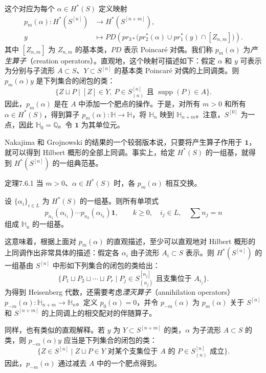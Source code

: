 这个对应为每个 $\alpha\in H^*(S)$ 定义映射
\[
\begin{aligned}
p_m(\alpha):H^*(S^{[n]})&\longrightarrow H^*(S^{[n+m]}),\\
y&\longmapsto PD\left(pr_{3*}\bigl(pr_2^*(\alpha)\cup pr_1^*(y)\cap[Z_{n,m}]\bigr)\right).
\end{aligned}
\]
其中 $[Z_{n,m}]$ 为 $Z_{n,m}$ 的基本类，$PD$ 表示 Poincaré 对偶。我们称 $p_m(\alpha)$ 为\emph{产生算子}（creation operators）。直观地，这个映射可描述如下：假定 $\alpha$ 和 $y$ 可表示为分别与子流形 $A\subset S$、$Y\subset S^{[n]}$ 的基本类 Poincaré 对偶的上同调类。则 $p_m(\alpha)y$ 是下列集合的闭包的类：
\[
\{Z\sqcup P\mid[Z]\in Y,\ P\in S_{(n)}^{[n]}
\text{ 且 }\operatorname{supp}(P)\in A\}.
\]
因此，$p_m(\alpha)$ 是在 $A$ 中添加一个肥点的操作。于是，对所有 $m>0$ 和所有 $\alpha\in H^*(S)$，得到算子 $p_m(\alpha):\mathbb H\to\mathbb H$，将 $\mathbb H_n$ 映到 $\mathbb H_{n+m}$。注意，$S^{[0]}$ 为一点，因此 $\mathbb H_0=\mathbb Q$。令 $\mathbf1$ 为其单位元。

Nakajima 和 Grojnowski 的结果的一个较弱版本说，只要将产生算子作用于 $\mathbf1$，就可以得到 Hilbert 概形的全部上同调。事实上，给定 $H^*(S)$ 的一组基，就得到 $H^*(S^{[n]})$ 的一组典范基。

\begin{origstatement}{定理}{7.6.1}\label{ch07:7.6.1}
当 $m>0$、$\alpha\in H^*(S)$ 时，各 $p_m(\alpha)$ 相互交换。

设 $\{\alpha_i\}_{i\in L}$ 为 $H^*(S)$ 的一组基。则所有单项式
\[
p_{n_1}(\alpha_{i_1})\cdots p_{n_k}(\alpha_{i_k})\mathbf1,
\qquad k\geq0,\quad i_j\in L,\quad\sum n_j=n
\]
组成 $\mathbb H_n$ 的一组基。
\end{origstatement}
这意味着，根据上面对 $p_m(\alpha)$ 的直观描述，至少可以直观地对 Hilbert 概形的上同调作出非常具体的描述：假定各 $\alpha_i$ 由子流形 $A_i\subset S$ 表示。则 $H^*(S^{[n]})$ 的一组基由 $S^{[n]}$ 中形如下列集合的闭包的类给出：
\[
\{P_1\sqcup P_2\sqcup\cdots\sqcup P_r\mid
P_j\in S_{(n_j)}^{[n_j]}\text{ 且支集位于 }A_{i_j}\}.
\]
为得到 Heisenberg 代数，还需要考虑\emph{湮灭算子}（annihilation operators）$p_{-m}(\alpha):\mathbb H_{n+m}\to\mathbb H_n$。定义 $p_0(\alpha)=0$，并令 $p_{-m}(\alpha)$ 为 $p_m(\alpha)$ 关于 $S^{[n]}$ 和 $S^{[n+m]}$ 的上同调上的相交配对的伴随算子。

同样，也有类似的直观解释。若 $y$ 为 $Y\subset S^{[n+m]}$ 的类，$\alpha$ 为子流形 $A\subset S$ 的类，则 $p_{-m}(\alpha)y$ 应当是下列集合的闭包的类：
\[
\{Z\in S^{[n]}\mid Z\sqcup P\in Y\text{ 对某个支集位于 }A
\text{ 的 }P\in S_{(n)}^{[n]}\text{ 成立}\}.
\]
因此，$p_{-m}(\alpha)$ 通过减去 $A$ 中的一个肥点得到。


